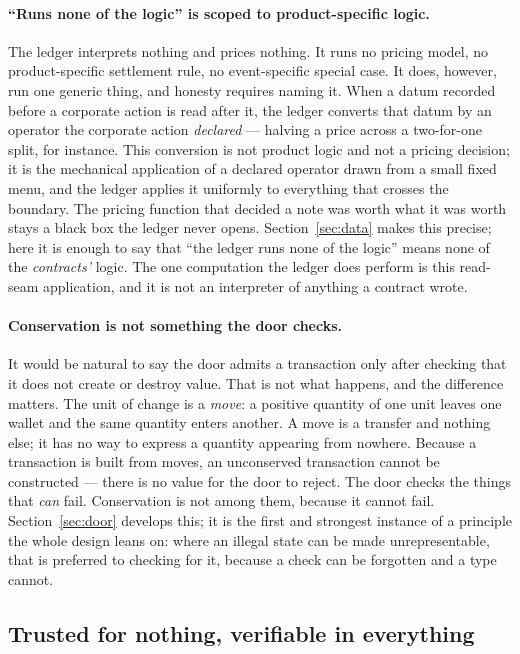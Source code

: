 \paragraph{``Runs none of the logic'' is scoped to product-specific logic.} The
ledger interprets nothing and prices nothing. It runs no pricing model, no
product-specific settlement rule, no event-specific special case. It does,
however, run one generic thing, and honesty requires naming it. When a datum
recorded before a corporate action is read after it, the ledger converts that
datum by an operator the corporate action \emph{declared} --- halving a price
across a two-for-one split, for instance. This conversion is not product logic
and not a pricing decision; it is the mechanical application of a declared
operator drawn from a small fixed menu, and the ledger applies it uniformly to
everything that crosses the boundary. The pricing function that decided a note was
worth what it was worth stays a black box the ledger never opens. Section~\ref{sec:data}
makes this precise; here it is enough to say that ``the ledger runs none of the
logic'' means none of the \emph{contracts'} logic. The one computation the ledger
does perform is this read-seam application, and it is not an interpreter of anything
a contract wrote.

\paragraph{Conservation is not something the door checks.} It would be natural to
say the door admits a transaction only after checking that it does not create or
destroy value. That is not what happens, and the difference matters. The unit of
change is a \emph{move}: a positive quantity of one unit leaves one wallet and the
same quantity enters another. A move is a transfer and nothing else; it has no way
to express a quantity appearing from nowhere. Because a transaction is built from
moves, an unconserved transaction cannot be constructed --- there is no value for
the door to reject. The door checks the things that \emph{can} fail. Conservation
is not among them, because it cannot fail. Section~\ref{sec:door} develops this;
it is the first and strongest instance of a principle the whole design leans on:
where an illegal state can be made unrepresentable, that is preferred to checking
for it, because a check can be forgotten and a type cannot.

\subsection{Trusted for nothing, verifiable in everything}

